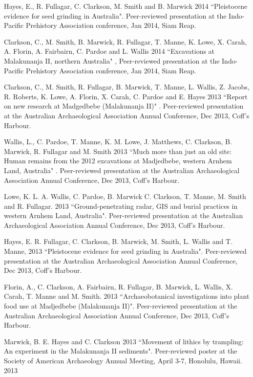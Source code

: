 \documentclass[11pt,article,oneside]{memoir}
\begin{document}
\ind Hayes, E., R. Fullagar, C. Clarkson, M. Smith and B. Marwick 2014 ``Pleistocene evidence for seed grinding in Australia". Peer-reviewed presentation at the Indo-Pacific Prehistory Association conference, Jan 2014, Siam Reap.

\ind Clarkson, C., M. Smith, B. Marwick, R. Fullagar, T. Manne, K. Lowe, X. Carah,  A. Florin, A.  Fairbairn, C. Pardoe and L. Wallis 2014 ``Excavations at Malakunanja II, northern Australia" ,  Peer-reviewed presentation at the Indo-Pacific Prehistory Association conference, Jan 2014, Siam Reap.

\ind Clarkson, C., M. Smith, R. Fullagar, B. Marwick, T. Manne, L. Wallis, Z. Jacobs, R. Roberts, K. Lowe, A. Florin, X. Carah, C. Pardoe and E. Hayes 2013 ``Report on new research at Madgedbebe (Malakunanja II)" . Peer-reviewed presentation at the Australian Archaeological Association Annual Conference, Dec 2013, Coff’s Harbour. 

\ind Wallis, L., C. Pardoe, T. Manne, K. M. Lowe, J. Matthews, C.   Clarkson, B. Marwick, R. Fullagar and M. Smith 2013 ``Much more than just an old site: Human remains from the 2012 excavations at Madjedbebe, western Arnhem Land, Australia" . Peer-reviewed presentation at the Australian Archaeological Association Annual Conference, Dec 2013, Coff’s Harbour.

\ind Lowe, K. L. A. Wallis, C. Pardoe, B. Marwick C. Clarkson, T. Manne, M. Smith and R. Fullagar. 2013 ``Ground-penetrating radar, GIS and burial practices in western Arnhem Land, Australia". Peer-reviewed presentation at the Australian Archaeological Association Annual Conference, Dec 2013, Coff’s Harbour.

\ind Hayes, E.  R. Fullagar, C. Clarkson, B. Marwick, M. Smith, L. Wallis and T. Manne, 2013 ``Pleistocene evidence for seed grinding in Australia". Peer-reviewed presentation at the Australian Archaeological Association Annual Conference, Dec 2013, Coff’s Harbour.

\ind Florin, A., C. Clarkson, A. Fairbairn, R. Fullagar, B. Marwick, L. Wallis, X. Carah, T. Manne and M. Smith. 2013 ``Archaeobotanical investigations into plant food use at Madjedbebe (Malakunanja II)". Peer-reviewed presentation at the Australian Archaeological Association Annual Conference, Dec 2013, Coff’s Harbour.

\ind Marwick, B. E. Hayes and C. Clarkson 2013 ``Movement of lithics by trampling: An experiment in the Malakunanja II sediments". Peer-reviewed poster at the Society of American Archaeology Annual Meeting, April 3-7, Honolulu, Hawaii. 2013
\end{document}
